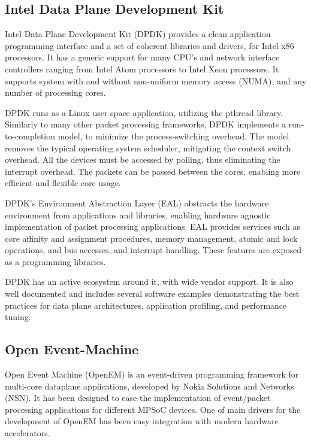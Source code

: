 \subsection{Intel Data Plane Development Kit}
Intel Data Plane Development Kit (DPDK) provides a clean application programming interface and a set of coherent libraries and drivers, for Intel x86 processors. It has a generic support for many CPU's and network interface controllers ranging from Intel Atom processors to Intel Xeon processors. It supports system with and without non-uniform memory access (NUMA), and any number of processing cores.~\cite{Intel:DPDK:Doc}

DPDK runs as a Linux user-space application, utilizing the pthread library. Similarly to many other packet processing frameworks, DPDK implements a run-to-completion model, to minimize the process-switching overhead. The model removes the typical operating system scheduler, mitigating the context switch overhead. All the devices must be accessed by polling, thus eliminating the interrupt overhead. The packets can be passed between the cores, enabling more efficient and flexible core usage.~\cite{Intel:DPDK:Doc}

DPDK's Environment Abstraction Layer (EAL) abstracts the hardware environment from applications and libraries, enabling hardware agnostic implementation of packet processing applications. EAL provides services such as core affinity and assignment procedures, memory management, atomic and lock operations, and bus accesses, and interrupt handling. These features are exposed as a programming libraries.~\cite{Intel:DPDK:Doc}

DPDK has an active ecosystem around it, with wide vendor support. It is also well documented and includes several software examples demonstrating the best practices for data plane architectures, application profiling, and performance tuning.~\cite{Intel:DPDK:Doc}

\subsection{Open Event-Machine}
\label{subsec:open-em}
Open Event Machine (OpenEM) is an event-driven programming framework for multi-core dataplane applications, developed by Nokia Solutions and Networks (NSN). It has been designed to ease the implementation of event/packet processing applications for different MPSoC devices. One of main drivers for the development of OpenEM has been easy integration with modern hardware accelerators.~\cite{NSN:2015:OpenEM}

